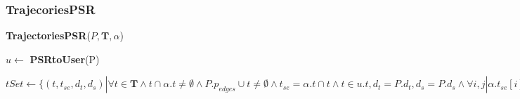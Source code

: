 \begin{frame}
\frametitle{TrajecoriesPSR}

\begin{algorithm}[H]
{\bf TrajectoriesPSR}({$P, \mathbf{T}, \alpha$})

	$u \leftarrow$ {\bf PSRtoUser}(P) 
 
 	$tSet \leftarrow \{(t, t_{se}, d_t, d_s) | \forall t \in \mathbf{T} \wedge t \cap \alpha.t \neq \emptyset \wedge P.p_{edges} \cup t \neq \emptyset \wedge t_{se} = \alpha.t \cap t \wedge t \in u.t, d_t = P.d_t, d_s = P.d_s \wedge \forall i,j | \alpha.t_{se}[i]_{\tau_{s}}-\frac{\alpha.d_t}{2} \leq t_{se}[j]_{\tau_{s}} \leq \alpha.t_{se}[i]_{\tau_{s}}+\frac{\alpha.d_t}{2} \}$


\end{algorithm}
\end{frame}